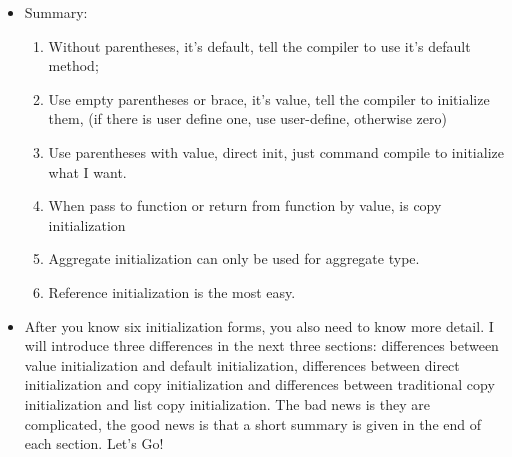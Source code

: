 \documentclass[a4paper,11pt,twoside]{book}
\begin{document}
\begin{itemize}
	\item Summary:
\begin{enumerate}
	\item Without parentheses, it's default, tell the compiler to use it's default method;
	\item Use empty parentheses or brace, it's value, tell the compiler to initialize them, (if there is user define one, use user-define, otherwise zero)
	\item Use parentheses with value, direct init, just command compile to initialize what I want.
	\item When pass to function or return from function by value, is copy initialization
	\item Aggregate initialization can only be used for aggregate type.
	\item Reference initialization is the most easy.
\end{enumerate}

	\item After you know six initialization forms, you also need to know more detail. I will introduce three differences in the next three sections: differences between value initialization and default initialization, differences between direct initialization and copy initialization and differences between traditional copy initialization and list copy initialization. The bad news is they are complicated, the good news is that a short summary is given in the end of each section. Let's Go!
\end{itemize}
\end{document}
